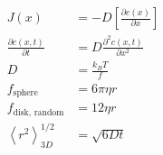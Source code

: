\begin{align*}
J(x) &= -D\left[\frac{\partial c(x)}{\partial x}\right]\\
\frac{\partial c(x,t)}{\partial t}&=D\frac{\partial ^2 c(x,t)}{\partial x^2}\\
D&=\frac{k_BT}{f}\\
f_{\textrm{sphere}}&=6\pi \eta r\\
f_{\textrm{disk, random}}&=12 \eta r\\
\left<r^2\right>^{1/2}_{3D}&=\sqrt{6Dt}\\
\end{align*}